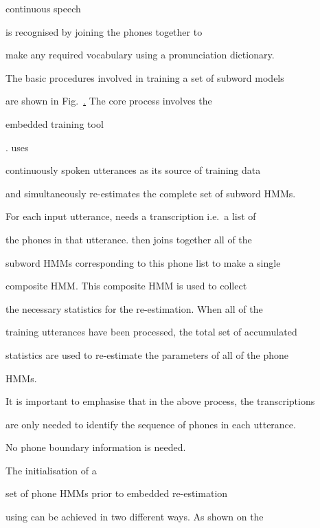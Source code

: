 continuous speech 


is recognised by joining the phones together to 


make any required vocabulary using a pronunciation dictionary.







The basic procedures involved in training a set of subword models


are shown in Fig.~\href{f:subword}.  The core process involves the


embedded training tool 


.   uses 


continuously spoken utterances as its source of training data


and simultaneously re-estimates the complete set of subword HMMs.


For each input utterance,  needs a transcription i.e.\ a list of


the phones in that utterance.   then joins together all of the 


subword HMMs corresponding to this phone list to make a single


composite HMM.  This composite HMM is used to collect


the necessary statistics for the re-estimation.  When all of the


training utterances have been processed, the total set of accumulated


statistics are used to re-estimate the parameters of all of the phone


HMMs. 


It is important to emphasise that in the above process, the transcriptions


are only needed to identify the sequence of phones in each utterance.


No phone boundary information is needed.  





The initialisation of a 


set of phone HMMs prior to embedded re-estimation


using  can be achieved in two different ways.  As shown on the


